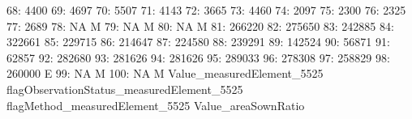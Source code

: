 \documentclass[nojss]{jss}
\begin{document}
\begin{Schunk}
\begin{Soutput}
 68:                       4400                                           
 69:                       4697                                           
 70:                       5507                                           
 71:                       4143                                           
 72:                       3665                                           
 73:                       4460                                           
 74:                       2097                                           
 75:                       2300                                           
 76:                       2325                                           
 77:                       2689                                           
 78:                         NA                                          M
 79:                         NA                                          M
 80:                         NA                                          M
 81:                     266220                                           
 82:                     275650                                           
 83:                     242885                                           
 84:                     322661                                           
 85:                     229715                                           
 86:                     214647                                           
 87:                     224580                                           
 88:                     239291                                           
 89:                     142524                                           
 90:                      56871                                           
 91:                      62857                                           
 92:                     282680                                           
 93:                     281626                                           
 94:                     281626                                           
 95:                     289033                                           
 96:                     278308                                           
 97:                     258829                                           
 98:                     260000                                          E
 99:                         NA                                          M
100:                         NA                                          M
     Value_measuredElement_5525 flagObservationStatus_measuredElement_5525
     flagMethod_measuredElement_5525 Value_areaSownRatio

\end{Soutput}
\end{Schunk}
\end{document}

